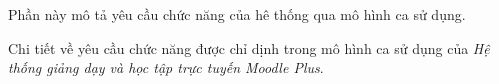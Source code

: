 \documentclass[./../main_file.tex]{subfiles}
\begin{document}
	
	Phần này mô tả yêu cầu chức năng của hê thống qua mô hình ca sử dụng.
	
	Chi tiết về yêu cầu chức năng được chỉ dịnh trong mô hình ca sử dụng của \emph{Hệ thống giảng dạy và học tập trực tuyến Moodle Plus}.
	
\end{document}
